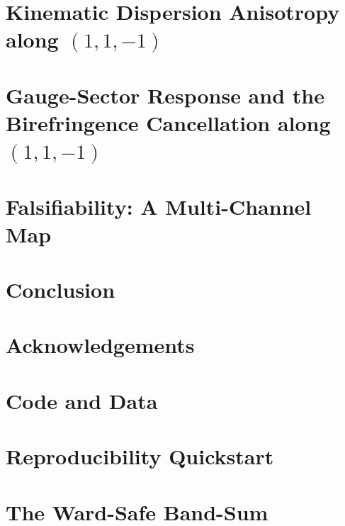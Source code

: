 \documentclass[12pt, letterpaper]{article}
\begin{document}
\section{Kinematic Dispersion Anisotropy along $(1,1,-1)$}


\section{Gauge-Sector Response and the Birefringence Cancellation along $(1,1,-1)$}


\section{Falsifiability: A Multi-Channel Map}



\section{Conclusion}


\section*{Acknowledgements}


\appendix

\section{Code and Data}


\section{Reproducibility Quickstart}


\section{The Ward-Safe Band-Sum}




\end{document}
